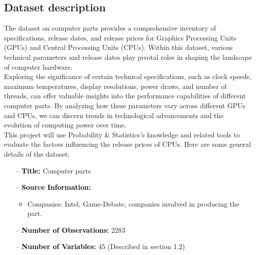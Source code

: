 \documentclass[a4paper]{article}
\begin{document}
	\subsection{Dataset description}
	The dataset on computer parts provides a comprehensive inventory of specifications, release dates, and release prices for Graphics Processing Units (GPUs) and Central Processing Units (CPUs). Within this dataset, various technical parameters and release dates play pivotal roles in shaping the landscape of computer hardware. \\Exploring the significance of certain technical specifications, such as clock speeds, maximum temperatures, display resolutions, power draws, and number of threads, can offer valuable insights into the performance capabilities of different computer parts. By analyzing how these parameters vary across different GPUs and CPUs, we can discern trends in technological advancements and the evolution of computing power over time.\\
	This project will use Probability \& Statistics’s knowledge and related tools to evaluate the factors influencing the release prices of CPUs. Here are some general details of the dataset:
	\begin{itemize}
		\item[--] \textbf{\textcolor{black}{Title}:} Computer parts
		\item[--] \textbf{\textcolor{black}{Source Information}:}
		\begin{itemize}
			\item Companies: Intel, Game-Debate, companies involved in producing the part.
		\end{itemize}
		\item[--] \textbf{\textcolor{black}{Number of Observations}:} 2283
		\item[--] \textbf{\textcolor{black}{Number of Variables}:} 45 (Described in section 1.2)
	\end{itemize}
\end{document}
